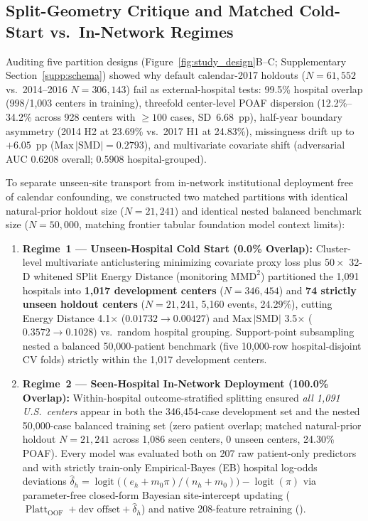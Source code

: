 \subsection{Split-Geometry Critique and Matched Cold-Start vs.\ In-Network Regimes}
Auditing five partition designs (Figure~\ref{fig:study_design}B--C; Supplementary Section~\ref{supp:schema}) showed why default calendar-2017 holdouts ($N=61{,}552$ vs.\ 2014--2016 $N=306{,}143$) fail as external-hospital tests: 99.5\% hospital overlap (998/1,003 centers in training), threefold center-level POAF dispersion (12.2\%--34.2\% across 928 centers with $\ge 100$ cases, SD~6.68~pp), half-year boundary asymmetry (2014 H2 at 23.69\% vs.\ 2017 H1 at 24.83\%), missingness drift up to $+6.05$~pp ($\mathrm{Max}\,|\mathrm{SMD}|=0.2793$), and multivariate covariate shift (adversarial AUC 0.6208 overall; 0.5908 hospital-grouped).

To separate unseen-site transport from in-network institutional deployment free of calendar confounding, we constructed two matched partitions with identical natural-prior holdout size ($N=21{,}241$) and identical nested balanced benchmark size ($N=50{,}000$, matching frontier tabular foundation model context limits\cite{jaeger2026tabpfn35,qu2026kumotabular,kong2026tabfm}):
\begin{enumerate}
  \item \textbf{Regime~1 — Unseen-Hospital Cold Start (0.0\% Overlap):} Cluster-level multivariate anticlustering\cite{papenberg2021anticlustering} minimizing covariate proxy loss plus $50\times$ 32-D whitened SPlit Energy Distance\cite{joseph2022split,szekely2013energy} (monitoring $\mathrm{MMD}^2$\cite{gretton2012kernel}) partitioned the 1,091 hospitals into \textbf{1,017 development centers} ($N=346{,}454$) and \textbf{74 strictly unseen holdout centers} ($N=21{,}241$, 5,160 events, 24.29\%), cutting Energy Distance 4.1$\times$ ($0.01732 \to 0.00427$) and $\mathrm{Max}\,|\mathrm{SMD}|$ 3.5$\times$ ($0.3572 \to 0.1028$) vs.\ random hospital grouping. Support-point subsampling\cite{joseph2022split} nested a balanced 50,000-patient benchmark (five 10,000-row hospital-disjoint CV folds) strictly within the 1,017 development centers.
  \item \textbf{Regime~2 — Seen-Hospital In-Network Deployment (100.0\% Overlap):} Within-hospital outcome-stratified splitting ensured \emph{all 1,091 U.S.\ centers} appear in both the 346,454-case development set and the nested 50,000-case balanced training set (zero patient overlap; matched natural-prior holdout $N=21{,}241$ across 1,086 seen centers, 0 unseen centers, 24.30\% POAF). Every model was evaluated both on 207 raw patient-only predictors and with strictly train-only Empirical-Bayes (EB) hospital log-odds deviations $\hat{\delta}_h = \operatorname{logit}\!\big((e_h + m_0\pi)/(n_h + m_0)\big) - \operatorname{logit}(\pi)$ via parameter-free closed-form Bayesian site-intercept updating ($\operatorname{Platt}_{\mathrm{OOF}} + \text{dev offset} + \hat{\delta}_h$) and native 208-feature retraining ().
\end{enumerate}

